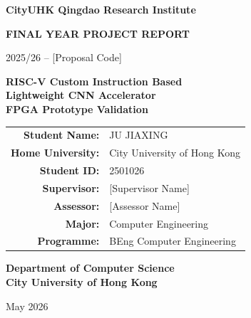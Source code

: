 \documentclass[12pt,a4paper,twoside]{report}
\newcommand{\projectcode}{[Proposal Code]}
\newcommand{\studentname}{JU JIAXING}
\newcommand{\homeuniversity}{City University of Hong Kong}
\newcommand{\studentid}{2501026}
\newcommand{\supervisor}{[Supervisor Name]}
\newcommand{\assessor}{[Assessor Name]}
\newcommand{\major}{Computer Engineering}
\newcommand{\programme}{BEng Computer Engineering}
\begin{document}
\begin{titlepage}
\thispagestyle{empty}
\begin{center}

\vspace*{1cm}

{\large\textbf{CityUHK Qingdao Research Institute}}

\vspace{0.8cm}

{\Large\textbf{FINAL YEAR PROJECT REPORT}}

\vspace{0.5cm}

{\large 2025/26 -- \projectcode}

\vspace{1.5cm}

{\Huge\textbf{RISC-V Custom Instruction Based \\[0.3cm] Lightweight CNN Accelerator \\[0.3cm] FPGA Prototype Validation}}

\vspace{2cm}

\begin{tabular}{rl}
\textbf{Student Name:} & \studentname \\
\textbf{Home University:} & \homeuniversity \\
\textbf{Student ID:} & \studentid \\
\textbf{Supervisor:} & \supervisor \\
\textbf{Assessor:} & \assessor \\
\textbf{Major:} & \major \\
\textbf{Programme:} & \programme \\
\end{tabular}

\vspace{2cm}

{\large\textbf{Department of Computer Science}\\[0.3cm]
\large\textbf{City University of Hong Kong}}

\vfill

{\large May 2026}

\end{center}
\end{titlepage}

\setcounter{page}{1}
\end{document}
